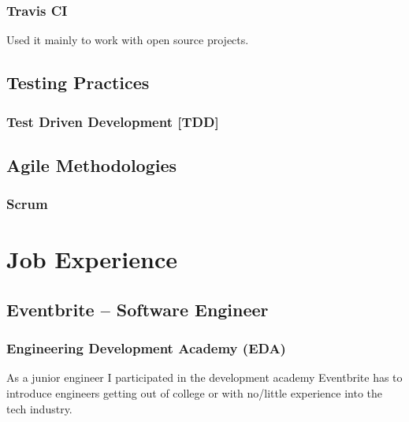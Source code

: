\documentclass{article}
\begin{document}
\subsubsection{Travis CI}
  \begin{description}
    \item Used it mainly to work with open source projects.
  \end{description}
\subsection{Testing Practices}
\subsubsection{Test Driven Development [TDD]}
\subsection{Agile Methodologies}
\subsubsection{Scrum}
\section{Job Experience}
\subsection{Eventbrite – Software Engineer}
\subsubsection{Engineering Development Academy (EDA)}
  \begin{description}
    \item As a junior engineer I participated in the development academy Eventbrite has to introduce engineers getting out of college or with no/little experience into the tech industry.
  \end{description}
\end{document}
